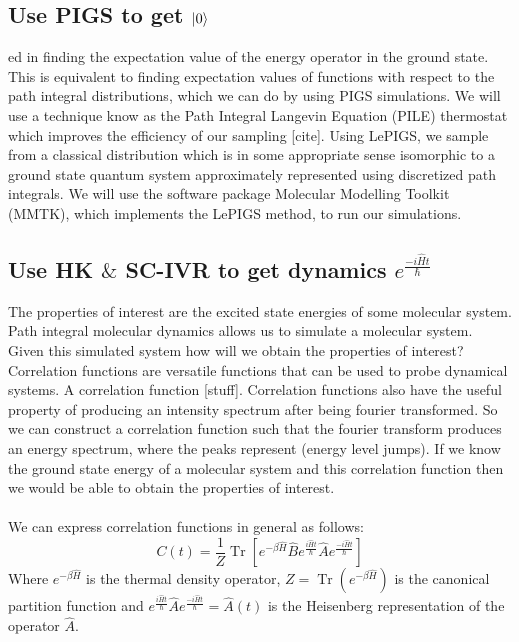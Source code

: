 \documentclass[12pt,letterpaper,oneside,final,titlepage]{article}               %
\numberwithin{equation}{section} %
\newcommand{\eBH}{e^{-\beta\hat{H}}}
\newcommand{\emiHt}{e^{\frac{-i\hat{H}t}{\hbar}}}
\newcommand{\eiHt}{e^{\frac{i\hat{H}t}{\hbar}}}
\DeclareMathOperator{\Tr}{Tr}
\begin{document}
\subsection{Use PIGS to get $\ket{0}$}
ed in finding the expectation value of the energy operator in the ground state. 
This is equivalent to finding expectation values of functions with respect to the path integral distributions, which we can do by using PIGS simulations.
We will use a technique know as the Path Integral Langevin Equation (PILE) thermostat which improves the efficiency of our sampling [cite].
Using LePIGS, we sample from a classical distribution which is in some appropriate sense isomorphic to a ground state quantum system approximately represented
using discretized path integrals. 
We will use the software package Molecular Modelling Toolkit (MMTK), which implements the LePIGS method, to run our simulations.

\subsection{Use HK $\&$ SC-IVR to get dynamics $\emiHt$} 
The properties of interest are the excited state energies of some molecular system. 
Path integral molecular dynamics allows us to simulate a molecular system. 
Given this simulated system how will we obtain the properties of interest?
Correlation functions are versatile functions that can be used to probe dynamical systems.
A correlation function [stuff].
Correlation functions also have the useful property of producing an intensity spectrum after being fourier transformed.
So we can construct a correlation function such that the fourier transform produces an energy spectrum, where the peaks
represent (energy level jumps).
If we know the ground state energy of a molecular system and this correlation function then we would be able to obtain the properties of interest. \\ \\
We can express correlation functions in general as follows:
\begin{equation}
    C(t) = \frac{1}{Z}\Tr[\eBH\hat{B}\eiHt\hat{A}\emiHt]
\end{equation}
Where $\eBH$ is the thermal density operator, $Z = \Tr(\eBH)$ is the canonical partition function 
and $\eiHt\hat{A}\emiHt=\hat{A}(t)$ is the Heisenberg representation of the operator $\hat{A}$.
\end{document}
